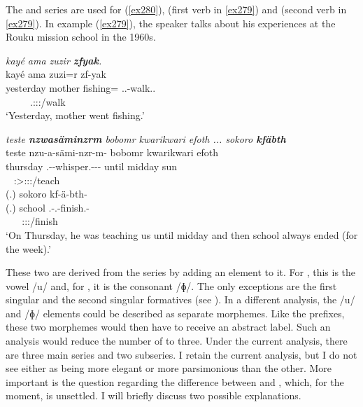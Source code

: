 The \Betaone{} and \Betatwo{} series are used for   (\ref{ex280}),   (first verb in \ref{ex279}) and   (second verb in \ref{ex279}). In example (\ref{ex279}), the speaker talks about his experiences at the Rouku mission school in the 1960s.

\begin{exe}
	\ex \emph{kayé ama zuzir \textbf{zfyak}.}\\
	\glll kayé ama zuzi=r zf-yak\\
	yesterday mother fishing={\Purp} \Tsg.\F.\Betatwo-walk.\Ext.\Ndu\\
	~ ~ ~ {\footnotesize \Tsg.\F:\Sbj:\Rpst:\Ipfv/walk}\\
	\trans `Yesterday, mother went fishing.' 
	\label{ex280}
\end{exe}
\begin{exe}
	\ex \emph{teste \textbf{nzwasäminzrm} bobomr kwarikwari efoth ... sokoro \textbf{kfäbth}}\\
	\glll teste nzu-a-sämi-nzr-m-\Zero{} bobomr {kwarikwari} efoth\\
	thursday \Fnsg.\Betaone-\Vc-whisper.\Ext-\Ndu-\Dur-\Stsg{} until {midday} sun\\
	~ {\footnotesize \Stsg:\Sbj>\Fpl:\Io:\Pst:\Dur/teach} ~ ~ ~\\
	\sn
	\glll (.) sokoro kf-ä-bth-\Zero{}\\
	(.) school \M.\Betatwo-\Vc.\Ndu-finish.\Rs-\Stsg{}\\
	~ ~ {\footnotesize \Stsg:\Sbj:\Pst:\Iter/finish}\\
	\trans `On Thursday, he was teaching us until midday and then school always ended (for the week).' 
	\label{ex279}
\end{exe}

These two  are derived from the \Bet{} series by adding an element to it. For \Betaone{}, this is the vowel /u/ and, for \Betatwo{}, it is the consonant /ɸ/. The only exceptions are the first  singular and the second  singular formatives (see ). In a different analysis, the /u/ and /ɸ/ elements could be described as separate morphemes. Like the prefixes, these two morphemes would then have to receive an abstract label. Such an analysis would reduce the number of  to three. Under the current analysis, there are three main series and two subseries. I retain the current analysis, but I do not see either as being more elegant or more parsimonious than the other. More important is the question regarding the difference between \Betaone{} and \Betatwo{}, which, for the moment, is unsettled. I will briefly discuss two possible explanations.

